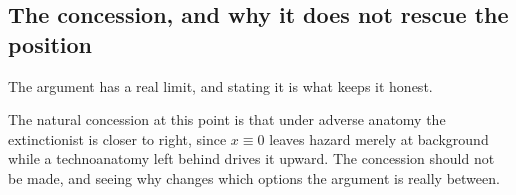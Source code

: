 \subsection{The concession, and why it does not rescue the position}
\label{hr:subsub:concession}

The argument has a real limit, and stating it is what keeps it honest.

\begin{remark}
\label{hr:rem:concession}
The natural concession at this point is that under adverse anatomy the
extinctionist is closer to right, since $x\equiv0$ leaves hazard merely
at background while a technoanatomy left behind drives it upward. The concession
should not be made, and seeing why changes which options the argument is
really between.


\end{remark}
